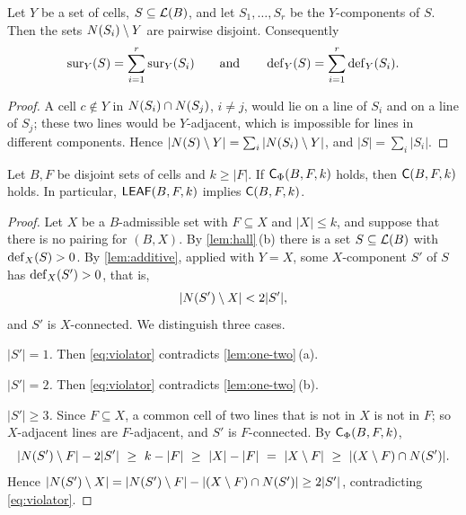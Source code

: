 \begin{lemma}\label{lem:additive}
Let $Y$ be a set of cells, $S\subseteq\mathcal{L}(B)$, and let $S_1,\dots,S_r$ be the $Y$-components of $S$. Then
the sets $N(S_i)\setminus Y$ are pairwise disjoint. Consequently
\[
  \operatorname{sur}_Y(S)=\sum_{i=1}^r\operatorname{sur}_Y(S_i)\qquad\text{and}\qquad \operatorname{def}_Y(S)=\sum_{i=1}^r\operatorname{def}_Y(S_i).
\]
\end{lemma}

\begin{proof}
A cell $c\notin Y$ in $N(S_i)\cap N(S_j)$, $i\ne j$, would lie on a line of $S_i$ and on a line of $S_j$;
these two lines would be $Y$-adjacent, which is impossible for lines in different components. Hence
$|N(S)\setminus Y|=\sum_i|N(S_i)\setminus Y|$, and $|S|=\sum_i|S_i|$.
\end{proof}

\begin{theorem}\label{thm:leaf-implies-C}
Let $B,F$ be disjoint sets of cells and $k\ge|F|$. If $\mathsf{C}_\Phi(B,F,k)$ holds, then $\mathsf{C}(B,F,k)$ holds. In
particular, $\mathsf{LEAF}(B,F,k)$ implies $\mathsf{C}(B,F,k)$.
\end{theorem}

\begin{proof}
Let $X$ be a $B$-admissible set with $F\subseteq X$ and $|X|\le k$, and suppose that there is no pairing for
$(B,X)$. By \cref{lem:hall}\,(b) there is a set $S\subseteq\mathcal{L}(B)$ with $\operatorname{def}_X(S)>0$. By
\cref{lem:additive}, applied with $Y=X$, some $X$-component $S'$ of $S$ has $\operatorname{def}_X(S')>0$, that is,
\begin{equation}\label{eq:violator}
  |N(S')\setminus X|<2|S'| ,
\end{equation}
and $S'$ is $X$-connected. We distinguish three cases.

\emph{$|S'|=1$.} Then \eqref{eq:violator} contradicts \cref{lem:one-two}\,(a).

\emph{$|S'|=2$.} Then \eqref{eq:violator} contradicts \cref{lem:one-two}\,(b).

\emph{$|S'|\ge 3$.} Since $F\subseteq X$, a common cell of two lines that is not in $X$ is not in $F$; so
$X$-adjacent lines are $F$-adjacent, and $S'$ is $F$-connected. By $\mathsf{C}_\Phi(B,F,k)$,
\[
  |\N(S')\setminus F|-2|S'|\ \ge\ k-|F|\ \ge\ |X|-|F|\ =\ |X\setminus F|\ \ge\ |(X\setminus F)\cap\N(S')| .
\]
Hence $|N(S')\setminus X|=|N(S')\setminus F|-|(X\setminus F)\cap N(S')|\ge 2|S'|$, contradicting
\eqref{eq:violator}.
\end{proof}

